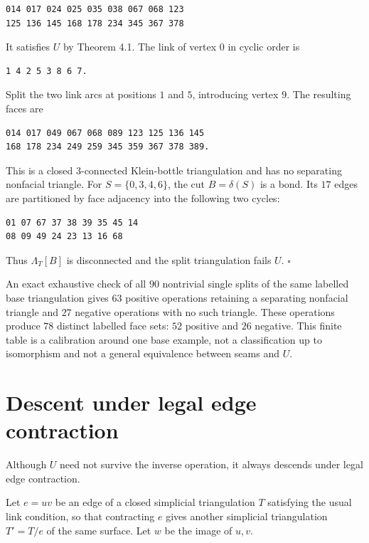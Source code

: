 \documentclass[11pt]{article}
\begin{document}
\begin{verbatim}
014 017 024 025 035 038 067 068 123
125 136 145 168 178 234 345 367 378
\end{verbatim}


It satisfies $U$ by Theorem 4.1. The link of vertex $0$ in cyclic order is

\begin{verbatim}
1 4 2 5 3 8 6 7.
\end{verbatim}


Split the two link arcs at positions $1$ and $5$, introducing vertex $9$.
The resulting faces are

\begin{verbatim}
014 017 049 067 068 089 123 125 136 145
168 178 234 249 259 345 359 367 378 389.
\end{verbatim}


This is a closed $3$-connected Klein-bottle triangulation and has no
separating nonfacial triangle. For $S=\{0,3,4,6\}$, the cut
$B=\delta(S)$ is a bond. Its $17$ edges are partitioned by face adjacency
into the following two cycles:

\begin{verbatim}
01 07 67 37 38 39 35 45 14
08 09 49 24 23 13 16 68
\end{verbatim}


Thus $\Lambda_T[B]$ is disconnected and the split triangulation fails $U$.
$\square$

An exact exhaustive check of all $90$ nontrivial single splits of the same
labelled base triangulation gives $63$ positive operations retaining a
separating nonfacial triangle and $27$ negative operations with no such
triangle. These operations produce $78$ distinct labelled face sets: $52$
positive and $26$ negative. This finite table is a calibration around one
base example, not a classification up to isomorphism and not a general
equivalence between seams and $U$.

\section{Descent under legal edge contraction}


Although $U$ need not survive the inverse operation, it always descends under
legal edge contraction.

Let $e=uv$ be an edge of a closed simplicial triangulation $T$ satisfying the
usual link condition, so that contracting $e$ gives another simplicial
triangulation $T'=T/e$ of the same surface. Let $w$ be the image of $u,v$.
\end{document}
